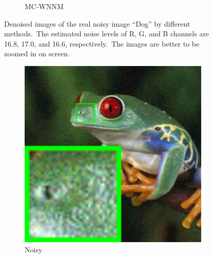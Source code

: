 \begin{figure}
\begin{subfigure}[t]{0.19\textwidth}
		\caption{MC-WNNM}
    \end{subfigure}
    \caption{Denoised images of the real noisy image ``Dog'' \cite{ncwebsite} by different methods.\ The estimated noise levels of R, G, and B channels are 16.8, 17.0, and 16.6, respectively.\ The images are better to be zoomed in on screen.}
    \label{fig4-9}
\end{figure}


\begin{figure}
    \centering
    \begin{subfigure}[t]{0.19\textwidth}
        \centering
        \includegraphics[width=1\textwidth]{images/mcwnnm/nc/resize_br_Noisy_frog.png}
		\caption{Noisy}
    \end{subfigure}
    \hfill
    \begin{subfigure}[t]{0.19\textwidth}
        \centering

\end{subfigure}
\end{figure}
